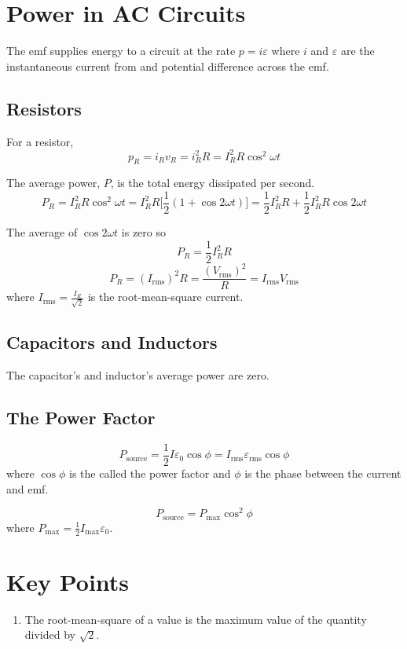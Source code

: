 \documentclass{article}
\begin{document}
\section*{Power in AC Circuits}
The emf supplies energy to a circuit at the rate $p=i\varepsilon$ where $i$ and $\varepsilon$ are
the instantaneous current from and potential difference across the emf.

\subsection*{Resistors}
For a resistor,
\[p_R = i_R v_R = i_R^2 R = I_R^2 R \cos^2 \omega t\]

The average power, $P$, is the total energy dissipated per second.
\[P_R = I_R^2 R \cos^2 \omega t = I_R^2 R \Big[\frac{1}{2}(1 + \cos 2\omega t)\Big] = \frac{1}{2}
I_R^2 R + \frac{1}{2}I_R^2 R \cos 2\omega t\]

The average of $\cos 2\omega t$ is zero so
\[P_R = \frac{1}{2} I_R^2 R\]
\[P_R = {(I_\text{rms})}^2 R = \frac{{(V_\text{rms})}^2}{R} = I_\text{rms}V_\text{rms}\]
where $I_\text{rms} = \frac{I_R}{\sqrt{2}}$ is the root-mean-square current.

\subsection*{Capacitors and Inductors}
The capacitor's and inductor's average power are zero.

\subsection*{The Power Factor}
\[P_\text{source} =  \frac{1}{2} I \varepsilon_0 \cos\phi = I_\text{rms}\varepsilon_\text{rms}\cos
\phi\]
where $\cos\phi$ is the called the power factor and $\phi$ is the phase between the current and
emf.

\[P_\text{source} = P_\text{max}\cos^2 \phi\]
where $P_\text{max} = \frac{1}{2} I_\text{max} \varepsilon_0$.

\section*{Key Points}
\begin{enumerate}
    \item The root-mean-square of a value is the maximum value of the quantity divided by
    $\sqrt{2}$.
\end{enumerate}
\end{document}

